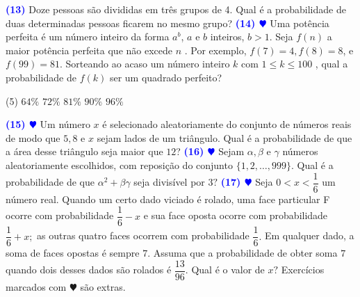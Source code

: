 \documentclass[12pt, a4paper]{article}
\newcommand{\negrito}[1]{\mbox{\boldmath{$#1$}}}
\begin{document}
\textcolor{blue}{\bf(13)} Doze pessoas são divididas em três grupos de 4. Qual é a probabilidade de duas determinadas pessoas ficarem no mesmo grupo?
\newline\newline
\textcolor{blue}{\bf(14) $\varheart$} Uma potência perfeita é um número inteiro da forma $a^b$, $a$ e $b$ inteiros, $b > 1$. Seja $f(n)$ a maior potência perfeita que não excede $n$ . Por exemplo, $f(7) = 4, f(8)=8$, e $f(99)=81$. Sorteando ao acaso um número inteiro $k$ com $1 \leq k \leq 100$ , qual a probabilidade de $f(k)$ ser um quadrado perfeito?
\begin{tasks}[counter-format={(tsk[a])},label-width=3.6ex, label-format = {\bfseries}, column-sep = {0pt}](5)
\task[\textcolor{Floresta}{$\negrito{(a)} $}] $64\%$
\task[\textcolor{Floresta}{$\negrito{(b)} $}] $72\%$
\task[\textcolor{Floresta}{$\negrito{(c)} $}] $81\%$
\task[\textcolor{Floresta}{$\negrito{(d)} $}] $90\%$
\task[\textcolor{Floresta}{$\negrito{(e)} $}] $96\%$
\end{tasks} 
\textcolor{blue}{\bf(15) $\varheart$} Um número $x$ é selecionado aleatoriamente do conjunto de números reais de modo que $5, 8$ e $x$ sejam lados de um triângulo. Qual é a probabilidade de que a área desse triângulo seja maior que $12$?%
\newline\newline
\textcolor{blue}{\bf(16) $\varheart$} Sejam $\alpha, \beta$ e $\gamma$ números aleatoriamente escolhidos, com reposição do conjunto $\{1,2,\ldots, 999\}.$ Qual é a probabilidade de que $\alpha^2 + \beta \gamma$ seja divisível por $3?$%
\newline\newline
\textcolor{blue}{\bf(17) $\varheart$} Seja $0 < x < \dfrac{1}{6}$ um número real. Quando um certo dado viciado é rolado, uma face particular F ocorre com probabilidade $\dfrac{1}{6} - x$ e sua face oposta ocorre com probabilidade $\dfrac{1}{6} + x;$ as outras quatro faces ocorrem com probabilidade $\dfrac{1}{6}.$ Em qualquer dado, a soma de faces opostas é sempre $7.$ Assuma que a probabilidade de obter soma $7$ quando dois desses dados são rolados é $\dfrac{13}{96}.$ Qual é o valor de $x?$%
\newline\newline
Exercícios marcados com $\varheart$ são extras.
\end{document}
